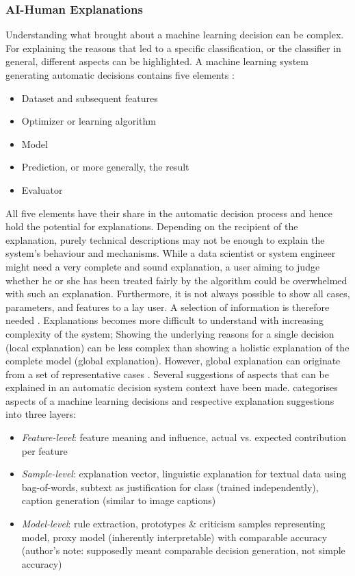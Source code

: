 \subsubsection{AI-Human Explanations}
Understanding what brought about a machine learning decision can be complex. For explaining the reasons that led to a specific classification, or the classifier in general, different aspects can be highlighted.\newline
A machine learning system generating automatic decisions contains five elements \cite{ventocilla2018taxonomy}:
\begin{itemize}
	\item Dataset and subsequent features
	\item Optimizer or learning algorithm
	\item Model 
	\item Prediction, or more generally, the result
	\item Evaluator
\end{itemize}
All five elements have their share in the automatic decision process and hence hold the potential for explanations. Depending on the recipient of the explanation, purely technical descriptions may not be enough to explain the system's behaviour and mechanisms. While a data scientist or system engineer might need a very complete and sound explanation, a user aiming to judge whether he or she has been treated fairly by the algorithm could be overwhelmed with such an explanation. Furthermore, it is not always possible to show all cases, parameters, and features to a lay user. A selection of information is therefore needed \cite{ribeiro2016should}. Explanations becomes more difficult to understand with increasing complexity of the system; Showing the underlying reasons for a single decision (local explanation) can be less complex than showing a holistic explanation of the complete model (global explanation). However, global explanation can originate from a set of representative cases \cite{ribeiro2016should}.\newline
Several suggestions of aspects that can be explained in an automatic decision system context have been made. \cite{biran2017explanation} categorises aspects of a machine learning decisions and respective explanation suggestions into three layers:
\begin{itemize}
	\item \textit{Feature-level}: feature meaning and influence, actual vs. expected contribution per feature
	\item \textit{Sample-level}: explanation vector, linguistic explanation for textual data using bag-of-words, subtext as justification for class (trained independently), caption generation (similar to image captions) 
	\item \textit{Model-level}: rule extraction, prototypes \& criticism samples representing model, proxy model (inherently interpretable) with comparable accuracy (author's note: supposedly meant comparable decision generation, not simple accuracy)
\end{itemize}
